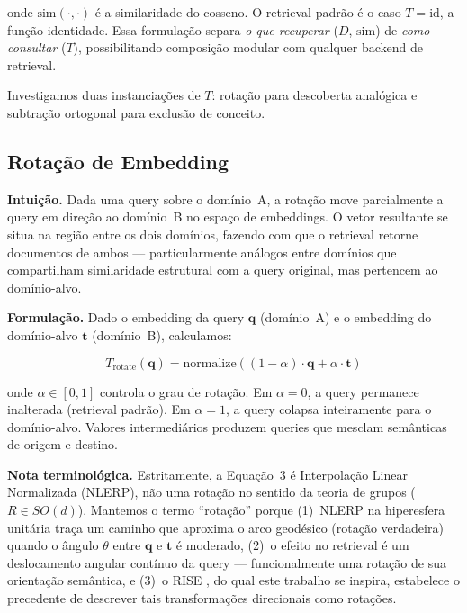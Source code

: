 \documentclass{article}
\begin{document}
onde $\text{sim}(\cdot, \cdot)$ é a similaridade do cosseno. O retrieval padrão é o caso $T = \text{id}$, a função identidade. Essa formulação separa \emph{o que recuperar} ($D$, $\text{sim}$) de \emph{como consultar} ($T$), possibilitando composição modular com qualquer backend de retrieval.

Investigamos duas instanciações de $T$: rotação para descoberta analógica e subtração ortogonal para exclusão de conceito.

\subsection{Rotação de Embedding}

\textbf{Intuição.} Dada uma query sobre o domínio~A, a rotação move parcialmente a query em direção ao domínio~B no espaço de embeddings. O vetor resultante se situa na região entre os dois domínios, fazendo com que o retrieval retorne documentos de ambos --- particularmente análogos entre domínios que compartilham similaridade estrutural com a query original, mas pertencem ao domínio-alvo.

\textbf{Formulação.} Dado o embedding da query $\mathbf{q}$ (domínio~A) e o embedding do domínio-alvo $\mathbf{t}$ (domínio~B), calculamos:

\begin{equation}
T_{\text{rotate}}(\mathbf{q}) = \text{normalize}\left((1 - \alpha) \cdot \mathbf{q} + \alpha \cdot \mathbf{t}\right)
\end{equation}

onde $\alpha \in [0, 1]$ controla o grau de rotação. Em $\alpha = 0$, a query permanece inalterada (retrieval padrão). Em $\alpha = 1$, a query colapsa inteiramente para o domínio-alvo. Valores intermediários produzem queries que mesclam semânticas de origem e destino.

\textbf{Nota terminológica.} Estritamente, a Equação~3 é Interpolação Linear Normalizada (NLERP), não uma rotação no sentido da teoria de grupos ($R \in SO(d)$). Mantemos o termo ``rotação'' porque (1)~NLERP na hiperesfera unitária traça um caminho que aproxima o arco geodésico (rotação verdadeira) quando o ângulo $\theta$ entre $\mathbf{q}$ e $\mathbf{t}$ é moderado, (2)~o efeito no retrieval é um deslocamento angular contínuo da query --- funcionalmente uma rotação de sua orientação semântica, e (3)~o RISE \cite{rise2025}, do qual este trabalho se inspira, estabelece o precedente de descrever tais transformações direcionais como rotações.
\end{document}
